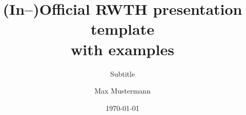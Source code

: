 \title[RWTH presentation template]{(In--)Official RWTH presentation template\\with examples}
\subtitle{Subtitle}
\author{Max Mustermann}
\date{\today}
\subject{RWTH presentation template}





